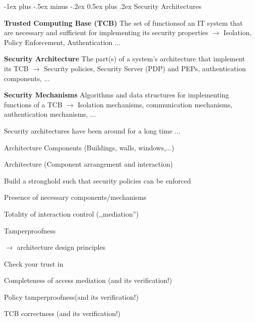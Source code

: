 \documentclass[a4paper]{article}
\makeatletter
\renewcommand{\note}[2]{\begin{noteBox} \textbf{#1} #2 \end{noteBox}}
\renewcommand{\section}{\@startsection{section}{1}{0mm}%
                {-1ex plus -.5ex minus -.2ex}%
                {0.5ex plus .2ex}%
                {\normalfont\large\bfseries}}
\makeatother
\begin{document}
\begin{multicols}{3}
    \section{Security Architectures}

    \note{Trusted Computing Base (TCB)}{The set of functionsof an IT system that are necessary and sufficient for implementing its security properties $\rightarrow$ Isolation, Policy Enforcement, Authentication ...}

    \note{Security Architecture}{The part(s) of a system’s architecture that implement its TCB $\rightarrow$ Security policies, Security Server (PDP) and PEPs, authentication components, ...}

    \note{Security Mechanisms}{Algorithms and data structures for implementing functions of a TCB $\rightarrow$ Isolation mechanisms, communication mechanisms, authentication mechanisms, ...}

    Security architectures have been around for a long time ...
    \begin{itemize*}
        \item Architecture Components (Buildings, walls, windows,...)
        \item Architecture (Component arrangement and interaction)
        \item Build a stronghold such that security policies can be enforced
        \begin{itemize*}
            \item Presence of necessary components/mechanisms
            \item Totality of interaction control (,,mediation'')
            \item Tamperproofness
            \item[$\rightarrow$] architecture design principles
        \end{itemize*}
    \end{itemize*}

    Check your trust in
    \begin{itemize*}
        \item Completeness of access mediation (and its verification!)
        \item Policy tamperproofness(and its verification!)
        \item TCB correctness (and its verification!)
    \end{itemize*}


\end{multicols}
\end{document}
